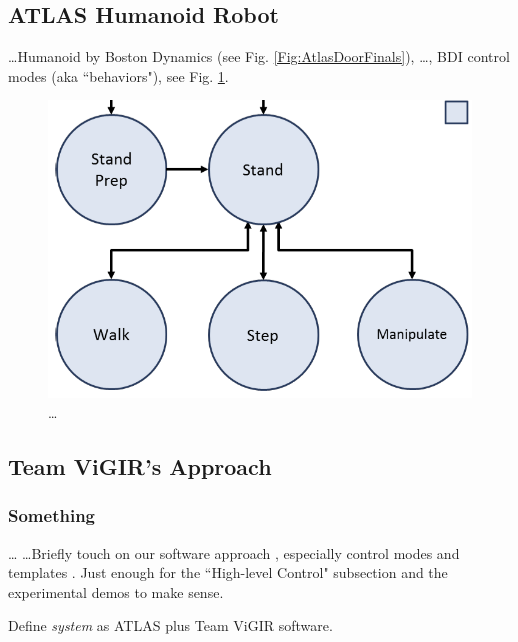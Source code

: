 
\subsection{ATLAS Humanoid Robot}

\ldots Humanoid by Boston Dynamics (see Fig. \ref{Fig:AtlasDoorFinals}), \ldots, BDI control modes (aka ``behaviors"), see Fig. \ref{Fig:ControlModeTS}.

\begin{figure}[t]
\centering
\includegraphics[width=0.99\columnwidth,clip]{./img/control_modes_ts.png}
\caption{\ldots
}
\label{Fig:ControlModeTS}
\end{figure}

\subsection{Team ViGIR's Approach}

\subsubsection{Something}  \ldots \cite{ROS2009ICRA, ROS} \ldots Briefly touch on our software approach \cite{TeamViGIR2014JFR}, especially control modes and templates \cite{Alberto2014Humanoids}. Just enough for the ``High-level Control" subsection and the experimental demos to make sense.

Define \emph{system} as ATLAS plus Team ViGIR software.

